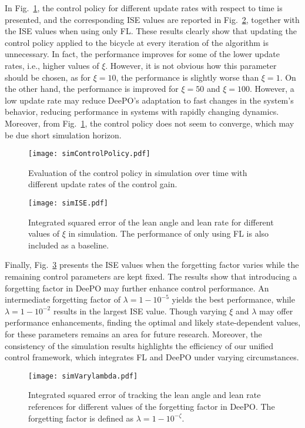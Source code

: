 In Fig.~\ref{fig:simControlPolicy}, the control policy for different update rates with respect to time is presented, and the corresponding ISE values are reported in Fig.~\ref{fig:simISE}, together with the ISE values when using only FL. These results clearly show that updating the control policy applied to the bicycle at every iteration of the algorithm is unnecessary. In fact, the performance improves for some of the lower update rates, i.e., higher values of $\xi$. However, it is not obvious how this parameter should be chosen, as for $\xi=10$, the performance is slightly worse than $\xi=1$. On the other hand, the performance is improved for $\xi=50$ and $\xi=100$. However, a low update rate may reduce DeePO's adaptation to fast changes in the system's behavior, reducing performance in systems with rapidly changing dynamics. Moreover, from Fig.~\ref{fig:simControlPolicy}, the control policy does not seem to converge, which may be due short simulation horizon. 

\begin{figure}[t]
    \centering
    \texttt{[image: simControlPolicy.pdf]}
    \caption{Evaluation of the control policy in simulation over time with different update rates of the control gain.}
    \label{fig:simControlPolicy}
\end{figure}

\begin{figure}[t]
    \centering
    \texttt{[image: simISE.pdf]}
    \caption{Integrated squared error of the lean angle and lean rate for different values of $\xi$ in simulation. The performance of only using FL is also included as a baseline.}
    \label{fig:simISE}
\end{figure}

Finally, Fig.~\ref{fig:simVarylambda} presents the ISE values when the forgetting factor varies while the remaining control parameters are kept fixed. The results show that introducing a forgetting factor in DeePO may further enhance control performance. An intermediate forgetting factor of $\lambda=1-10^{-5}$ yields the best performance, while $\lambda = 1-10^{-2}$ results in the largest ISE value. Though varying $\xi$ and $\lambda$ may offer performance enhancements, finding the optimal and likely state-dependent values, for these parameters remains an area for future research. Moreover, the consistency of the simulation results highlights the efficiency of our unified control framework, which integrates FL and DeePO under varying circumstances.

\begin{figure}[t]
    \centering
    \texttt{[image: simVarylambda.pdf]}
    \caption{Integrated squared error of tracking the lean angle and lean rate references for different values of the forgetting factor in DeePO. The forgetting factor is defined as $\lambda = 1 - 10^{-\zeta}$.}
    \label{fig:simVarylambda}
\end{figure}





